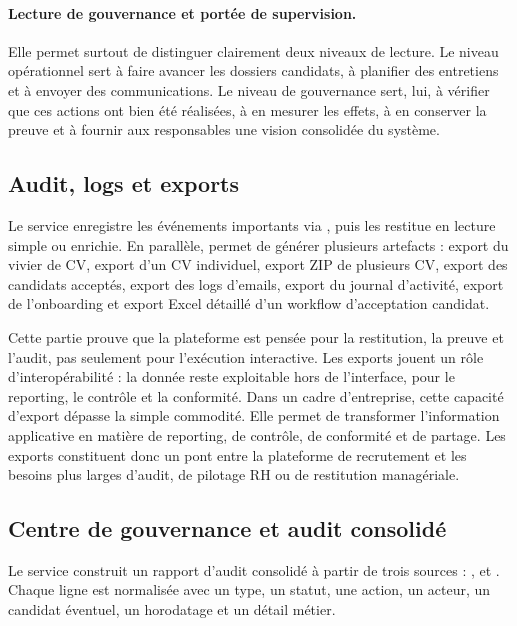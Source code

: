 \paragraph{Lecture de gouvernance et portée de supervision.}

Elle permet surtout de distinguer clairement deux niveaux de lecture. Le niveau opérationnel sert à faire avancer les dossiers candidats, à planifier des entretiens et à envoyer des communications. Le niveau de gouvernance sert, lui, à vérifier que ces actions ont bien été réalisées, à en mesurer les effets, à en conserver la preuve et à fournir aux responsables une vision consolidée du système.


\subsection{Audit, logs et exports}
Le service  enregistre les événements importants via , puis les restitue en lecture simple ou enrichie. En parallèle,  permet de générer plusieurs artefacts : export du vivier de CV, export d'un CV individuel, export ZIP de plusieurs CV, export des candidats acceptés, export des logs d'emails, export du journal d'activité, export de l'onboarding et export Excel détaillé d'un workflow d'acceptation candidat.

Cette partie prouve que la plateforme est pensée pour la restitution, la preuve et l'audit, pas seulement pour l'exécution interactive. Les exports jouent un rôle d'interopérabilité : la donnée reste exploitable hors de l'interface, pour le reporting, le contrôle et la conformité.
Dans un cadre d'entreprise, cette capacité d'export dépasse la simple commodité. Elle permet de transformer l'information applicative en matière de reporting, de contrôle, de conformité et de partage. Les exports constituent donc un pont entre la plateforme de recrutement et les besoins plus larges d'audit, de pilotage RH ou de restitution managériale.

\subsection{Centre de gouvernance et audit consolidé}
Le service  construit un rapport d'audit consolidé à partir de trois sources : ,  et . Chaque ligne est normalisée avec un type, un statut, une action, un acteur, un candidat éventuel, un horodatage et un détail métier.

